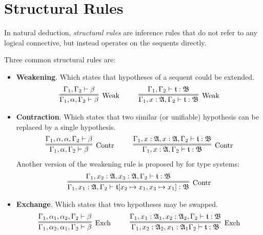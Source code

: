 \section{Structural Rules}

In natural deduction, \textit{structural rules} are inference rules that do not refer to any logical connective, but instead operates on the sequents directly.

Three common structural rules are:
\begin{itemize}
    \item \textbf{Weakening}. Which states that hypotheses of a sequent could be extended.
    \begin{gather*}
        \infer=[\mbox{Weak}]{\Gamma_1, \alpha, \Gamma_2 \vdash \beta}{\Gamma_1, \Gamma_2 \vdash \beta}
        ~~~~ ~~~~
        \infer=[\mbox{Weak}]{\Gamma_1, x : \A, \Gamma_2\vdash \t : \mathfrak{B}}{\Gamma_1, \Gamma_2\vdash \t : \mathfrak{B}}
    \end{gather*}
    \item \textbf{Contraction}. Which states that two similar (or unifiable) hypothesis can be replaced by a single hypothesis.
    \begin{gather*}
        \infer=[\mbox{Contr}]{\Gamma_1, \alpha, \Gamma_2 \vdash \beta}{\Gamma_1, \alpha, \alpha, \Gamma_2 \vdash \beta}
        ~~~~ ~~~~
        \infer=[\mbox{Contr}]{\Gamma_1, x : \A, \Gamma_2 \vdash \t : \mathfrak{B}}{\Gamma_1, x : \A, x : \A, \Gamma_2 \vdash \t : \mathfrak{B}}
    \end{gather*}
    Another version of the weakening rule is proposed by \cite{DavidWalker2004} for type systems:
    \begin{gather*}
        \infer=[\mbox{Contr}]{\Gamma_1, x_1 : \A, \Gamma_2 \vdash \t[x_2 \mapsto x_1, x_3 \mapsto x_1] : \mathfrak{B}}{\Gamma_1, x_2 : \A, x_3 : \A, \Gamma_2 \vdash \t : \mathfrak{B}}
    \end{gather*}
    \item \textbf{Exchange}. Which states that two hypotheses may be swapped.
    \begin{gather*}
        \infer=[\mbox{Exch}]{\Gamma_1, \alpha_2, \alpha_1, \Gamma_2 \vdash \beta}{\Gamma_1, \alpha_1, \alpha_2, \Gamma_2 \vdash \beta}
        ~~~~ ~~~~
        \infer=[\mbox{Exch}]{\Gamma_1, x_2 : \A_2, x_1 : \A_1 \Gamma_2 \vdash \t : \mathfrak{B}}{\Gamma_1, x_1 : \A_1, x_2 : \A_2, \Gamma_2 \vdash \t : \mathfrak{B}}
    \end{gather*}
\end{itemize}

